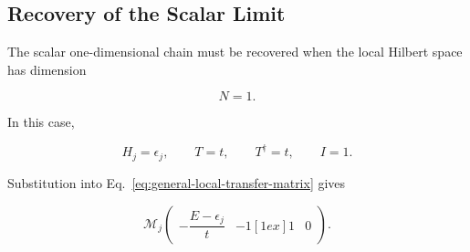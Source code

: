 \begin{center}
\end{center}


\subsection{Recovery of the Scalar Limit}

The scalar one-dimensional chain must be recovered when the local Hilbert
space has dimension

\begin{equation}
	N=1.
\end{equation}

In this case,

\begin{equation}
	H_j=\epsilon_j,
	\qquad
	T=t,
	\qquad
	T^\dagger=t,
	\qquad
	I=1.
\end{equation}

Substitution into Eq.~\eqref{eq:general-local-transfer-matrix} gives

\begin{equation}
	\mathcal{M}_j
	\begin{pmatrix}
		-\dfrac{E-\epsilon_j}{t}
		 &
		-1
		[1ex]
		1
		 &
		0
	\end{pmatrix}.
	\label{eq:scalar-transfer-limit}
\end{equation}

